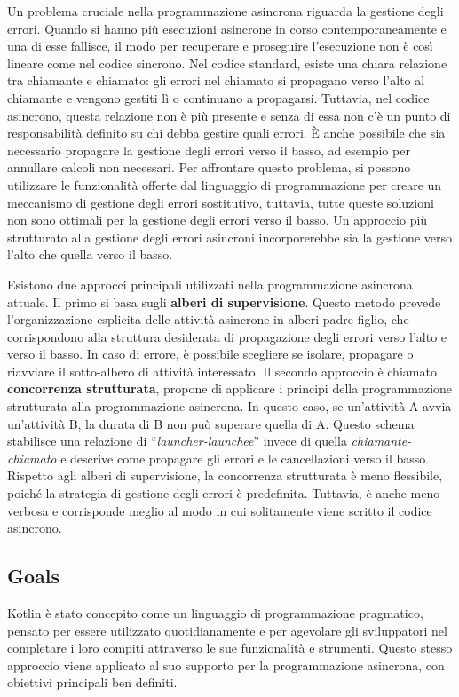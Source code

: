 \documentclass[12pt,a4paper,openright,twoside]{book}
\begin{document}
Un problema cruciale nella programmazione asincrona riguarda la gestione degli errori. Quando si hanno più esecuzioni asincrone in corso contemporaneamente e una di esse fallisce, il modo per recuperare e proseguire l'esecuzione non è così lineare come nel codice sincrono. Nel codice standard, esiste una chiara relazione tra chiamante e chiamato: gli errori nel chiamato si propagano verso l'alto al chiamante e vengono gestiti lì o continuano a propagarsi. Tuttavia, nel codice asincrono, questa relazione non è più presente e senza di essa non c'è un punto di responsabilità definito su chi debba gestire quali errori. È anche possibile che sia necessario propagare la gestione degli errori verso il basso, ad esempio per annullare calcoli non necessari.
Per affrontare questo problema, si possono utilizzare le funzionalità offerte dal linguaggio di programmazione per creare un meccanismo di gestione degli errori sostitutivo, tuttavia, tutte queste soluzioni non sono ottimali per la gestione degli errori verso il basso.
Un approccio più strutturato alla gestione degli errori asincroni incorporerebbe sia la gestione verso l'alto che quella verso il basso. 

Esistono due approcci principali utilizzati nella programmazione asincrona attuale. Il primo si basa sugli \textbf{alberi di supervisione}. Questo metodo prevede l'organizzazione esplicita delle attività asincrone in alberi padre-figlio, che corrispondono alla struttura desiderata di propagazione degli errori verso l'alto e verso il basso. In caso di errore, è possibile scegliere se isolare, propagare o riavviare il sotto-albero di attività interessato. Il secondo approccio è chiamato \textbf{concorrenza strutturata}, propone di applicare i principi della programmazione strutturata alla programmazione asincrona. In questo caso, se un'attività A avvia un'attività B, la durata di B non può superare quella di A. Questo schema stabilisce una relazione di ``\textit{launcher-launchee}'' invece di quella \textit{chiamante-chiamato} e descrive come propagare gli errori e le cancellazioni verso il basso.
Rispetto agli alberi di supervisione, la concorrenza strutturata è meno flessibile, poiché la strategia di gestione degli errori è predefinita. Tuttavia, è anche meno verbosa e corrisponde meglio al modo in cui solitamente viene scritto il codice asincrono.

\subsection{Goals}
Kotlin è stato concepito come un linguaggio di programmazione pragmatico, pensato per essere utilizzato quotidianamente e per agevolare gli sviluppatori nel completare i loro compiti attraverso le sue funzionalità e strumenti. Questo stesso approccio viene applicato al suo supporto per la programmazione asincrona, con obiettivi principali ben definiti.
\end{document}
